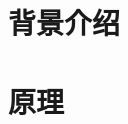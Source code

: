 \documentclass[10pt,a4paper]{article}
\begin{document}
%
\section{背景介绍}

\section{原理}

\end{document}
